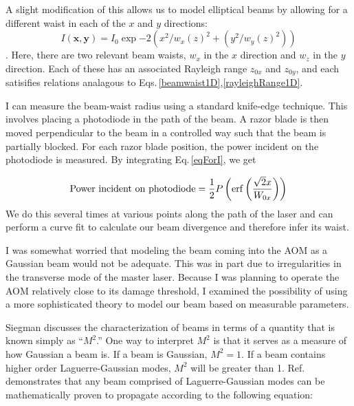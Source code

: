 A slight modification of this allows us to model elliptical beams by allowing for a different waist in each of the $x$ and $y$ directions:
\begin{equation}\label{eqForI}
    I(\mathbf{x,y})=I_0\exp{-2(x^2/w_x(z)^2+(y^2/w_y(z)^2))}
\end{equation}.
Here, there are two relevant beam waists, $w_x$ in the $x$ direction and $w_z$ in the $y$ direction. Each of these has an associated Rayleigh range $z_{0x}$ and $z_{0y}$, and each satisifies relations analagous to Eqs.\,\ref{beamwaist1D},\ref{rayleighRange1D}.

I can measure the beam-waist radius using a standard knife-edge technique. This involves placing a photodiode in the path of the beam. A razor blade is then moved perpendicular to the beam in a controlled way such that the beam is partially blocked. For each razor blade position, the power incident on the photodiode is measured. By integrating Eq.\,\ref{eqForI}, we get

\begin{equation}
{\rm Power\ incident\ on\ photodiode}=\frac{1}{2} P \left(\erf \left( \frac{\sqrt{2} x}{W_{0x}}\right)\right)
\end{equation}
We do this several times at various points along the path of the laser and can perform a curve fit to calculate our beam divergence and therefore infer its waist. 

I was somewhat worried that modeling the beam coming into the AOM as a Gaussian beam would not be adequate. This was in part due to irregularities in the transverse mode of the master laser.
Because I was planning to operate the AOM relatively close to its damage threshold, I examined the possibility of using a more sophisticated theory to model our beam based on measurable parameters. 

Siegman \cite{SiegmanBeamQuality} discusses the characterization of beams in terms of a quantity that is known simply as ``$M^2$.'' One way to interpret $M^2$ is that it serves as a measure of how Gaussian a beam is. If a beam is Gaussian, $M^2=1$. If a beam contains higher order Laguerre-Gaussian modes, $M^2$ will be greater than 1. Ref.\,\cite{SiegmanBeamQuality} demonstrates that any beam comprised of Laguerre-Gaussian modes can be mathematically proven to propagate according to the following equation:

